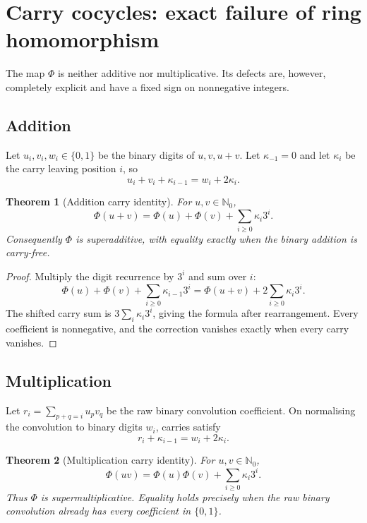 \documentclass[11pt]{article}
\newtheorem{theorem}{Theorem}[section]
\theoremstyle{definition}
\theoremstyle{remark}
\newcommand{\Nzero}{\mathbb N_0}
\newcommand{\PhiMap}{\Phi}
\begin{document}
\section{Carry cocycles: exact failure of ring homomorphism}

The map $\PhiMap$ is neither additive nor multiplicative.  Its defects are,
however, completely explicit and have a fixed sign on nonnegative integers.

\subsection{Addition}

Let $u_i,v_i,w_i\in\{0,1\}$ be the binary digits of $u,v,u+v$.  Let
$\kappa_{-1}=0$ and let $\kappa_i$ be the carry leaving position $i$, so
\[
  u_i+v_i+\kappa_{i-1}=w_i+2\kappa_i.
\]

\begin{theorem}[Addition carry identity]\label{thm:add-carry}
For $u,v\in\Nzero$,
\[
 \boxed{
 \PhiMap(u+v)=\PhiMap(u)+\PhiMap(v)
       +\sum_{i\ge0}\kappa_i3^i.}
\]
Consequently $\PhiMap$ is superadditive, with equality exactly when the binary
addition is carry-free.
\end{theorem}

\begin{proof}
Multiply the digit recurrence by $3^i$ and sum over $i$:
\[
 \PhiMap(u)+\PhiMap(v)+\sum_{i\ge0}\kappa_{i-1}3^i
 =\PhiMap(u+v)+2\sum_{i\ge0}\kappa_i3^i.
\]
The shifted carry sum is $3\sum_i\kappa_i3^i$, giving the formula after
rearrangement.  Every coefficient is nonnegative, and the correction vanishes
exactly when every carry vanishes.
\end{proof}

\subsection{Multiplication}

Let $r_i=\sum_{p+q=i}u_pv_q$ be the raw binary convolution coefficient.  On
normalising the convolution to binary digits $w_i$, carries satisfy
\[
  r_i+\kappa_{i-1}=w_i+2\kappa_i.
\]

\begin{theorem}[Multiplication carry identity]\label{thm:mul-carry}
For $u,v\in\Nzero$,
\[
 \boxed{
 \PhiMap(uv)=\PhiMap(u)\PhiMap(v)
       +\sum_{i\ge0}\kappa_i3^i.}
\]
Thus $\PhiMap$ is supermultiplicative.  Equality holds precisely when the raw
binary convolution already has every coefficient in $\{0,1\}$.
\end{theorem}
\end{document}
